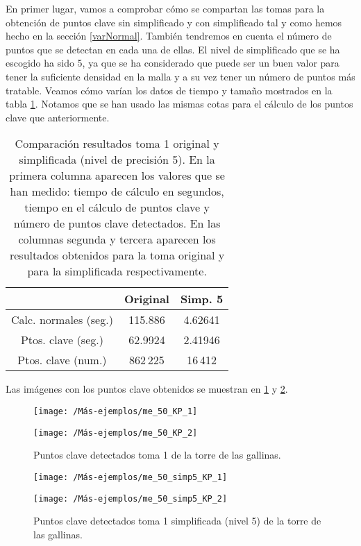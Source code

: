 En primer lugar, vamos a comprobar cómo se compartan las tomas para la obtención de puntos clave sin simplificado y con simplificado tal y como hemos hecho en la sección \ref{varNormal}. También tendremos en cuenta el número de puntos que se detectan en cada una de ellas. El nivel de simplificado que se ha escogido ha sido 5, ya que se ha considerado que puede ser un buen valor para tener la suficiente densidad en la malla y a su vez tener un número de puntos más tratable. Veamos cómo varían los datos de tiempo y tamaño mostrados en la tabla \ref{table:me-normal}. Notamos que se han usado las mismas cotas para el cálculo de los puntos clave que anteriormente.

\begin{table}[h!]
	\centering
	\begin{tabular}{| c | c | c |} 
		\hline
		& Original  & Simp. 5 \\
		\hline
		Calc. normales (seg.) & 115.886  &  4.62641\\			 
		Ptos. clave (seg.) & 62.9924 & 2.41946\\
		Ptos. clave (num.) & 862\,225 & 16\,412\\
		\hline
	\end{tabular}
	\caption{Comparación resultados toma 1 original y simplificada (nivel de precisión 5). En la primera columna aparecen los valores que se han medido: tiempo de cálculo en segundos, tiempo en el cálculo de puntos clave y número de puntos clave detectados. En las columnas segunda y tercera aparecen los resultados obtenidos para la toma original y para la simplificada respectivamente.}
	\label{table:me-normal}
\end{table}

Las imágenes con los puntos clave obtenidos se muestran en \ref{me_50_KP} y \ref{me_50_KP_simp4}. 

\begin{figure}[h!]	
	\begin{minipage}[b]{0.5\textwidth}
		\centering		
		\texttt{[image: /Más-ejemplos/me\_50\_KP\_1]} 
	\end{minipage}
	\begin{minipage}[b]{0.5\textwidth}
		\centering
		\texttt{[image: /Más-ejemplos/me\_50\_KP\_2]}
	\end{minipage}
	\caption{Puntos clave detectados toma 1 de la torre de las gallinas.}
	\label{me_50_KP}
\end{figure}
\begin{figure}[h!]	
	\begin{minipage}{0.5\textwidth}
		\centering		
		\texttt{[image: /Más-ejemplos/me\_50\_simp5\_KP\_1]} 
	\end{minipage}
	\begin{minipage}{0.5\textwidth}
		\centering
		\texttt{[image: /Más-ejemplos/me\_50\_simp5\_KP\_2]}
	\end{minipage}
	\caption{Puntos clave detectados toma 1 simplificada (nivel 5) de la torre de las gallinas.}
	\label{me_50_KP_simp4}
\end{figure}

